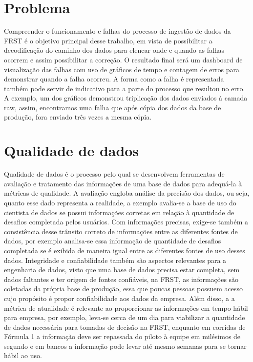 \section{Problema}

Compreender o funcionamento e falhas do processo de ingestão de dados da FRST é o objetivo principal desse trabalho, em vista de possibilitar a decodificação do caminho dos dados para elencar onde e quando as falhas ocorrem e assim possibilitar a correção. O resultado final será um dashboard de visualização das falhas com uso de gráficos de tempo e contagem de erros para demonstrar quando a falha ocorreu. A forma como a falha é representada também pode servir de indicativo para a parte do processo que resultou no erro. A exemplo, um dos gráficos demonstrou triplicação dos dados enviados à camada raw, assim, encontramos uma falha que após cópia dos dados da base de produção, fora enviado três vezes a mesma cópia. 

\section{Qualidade de dados}

Qualidade de dados é o processo pelo qual se desenvolvem ferramentas de avaliação e tratamento das informações de uma base de dados para adequá-la à métricas de qualidade.
A avaliação engloba análise da precisão dos dados, ou seja, quanto esse dado representa a realidade, a exemplo avalia-se a base de uso do cientista de dados se possui informações corretas em relação à quantidade de desafios completada pelos usuários. Com informações precisas, exige-se também a consistência desse trânsito correto de informações entre as diferentes fontes de dados, por exemplo analisa-se essa informação de quantidade de desafios completada se é exibida de maneira igual entre as diferentes fontes de uso desses dados. Integridade e confiabilidade também são aspectos relevantes para a engenharia de dados, visto que uma base de dados precisa estar completa, sem dados faltantes e ter origem de fontes confiáveis, na FRST, as informações são coletadas da própria base de produção, essa que poucas pessoas possuem acesso cujo propósito é propor confiabilidade aos dados da empresa. Além disso, a a métrica de atualidade é relevante ao proporcionar as informações em tempo hábil para empresa, por exemplo, leva-se cerca de um dia para viabilizar a quantidade de dados necessária para tomadas de decisão na FRST, enquanto em corridas de Fórmula 1 a informação deve ser repassada do piloto à equipe em milésimos de segundo e em bancos a informação pode levar até mesmo semanas para se tornar hábil ao uso.

